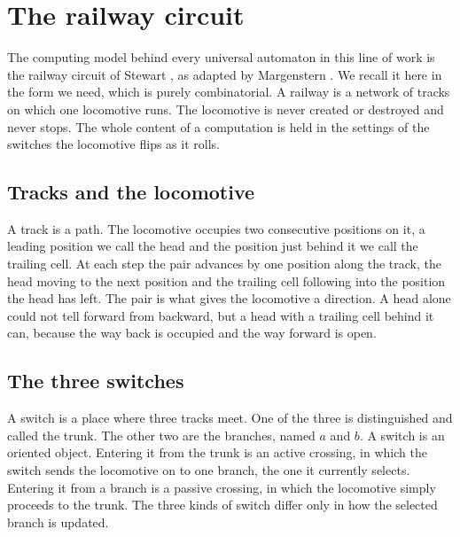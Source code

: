 \section{The railway circuit}
\label{sec:railway}

The computing model behind every universal automaton in this line of work is the railway circuit of Stewart
\cite{stewart1994}, as adapted by Margenstern \cite{margenstern2008vol2}. We recall it here in the form we
need, which is purely combinatorial. A railway is a network of tracks on which one locomotive runs. The
locomotive is never created or destroyed and never stops. The whole content of a computation is held in the
settings of the switches the locomotive flips as it rolls.

\subsection{Tracks and the locomotive}

A track is a path. The locomotive occupies two consecutive positions on it, a leading position we call the
head and the position just behind it we call the trailing cell. At each step the pair advances by one position
along the track, the head moving to the next position and the trailing cell following into the position the
head has left. The pair is what gives the locomotive a direction. A head alone could not tell forward from
backward, but a head with a trailing cell behind it can, because the way back is occupied and the way forward
is open.

\subsection{The three switches}

A switch is a place where three tracks meet. One of the three is distinguished and called the trunk. The other
two are the branches, named $a$ and $b$. A switch is an oriented object. Entering it from the trunk is an
active crossing, in which the switch sends the locomotive on to one branch, the one it currently selects.
Entering it from a branch is a passive crossing, in which the locomotive simply proceeds to the trunk. The
three kinds of switch differ only in how the selected branch is updated.

